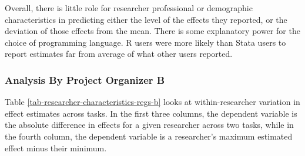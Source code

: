 \documentclass[
  letterpaper,
  DIV=11,
  numbers=noendperiod]{scrartcl}
\begin{document}
Overall, there is little role for researcher professional or demographic
characteristics in predicting either the level of the effects they
reported, or the deviation of those effects from the mean. There is some
explanatory power for the choice of programming language. R users were
more likely than Stata users to report estimates far from average of
what other users reported.

\hypertarget{analysis-by-project-organizer-b}{%
\subsubsection{Analysis By Project Organizer
B}\label{analysis-by-project-organizer-b}}

Table \ref{tab-researcher-characteristics-regs-b} looks at
within-researcher variation in effect estimates across tasks. In the
first three columns, the dependent variable is the absolute difference
in effects for a given researcher across two tasks, while in the fourth
column, the dependent variable is a researcher's maximum estimated
effect minus their minimum.
\end{document}

